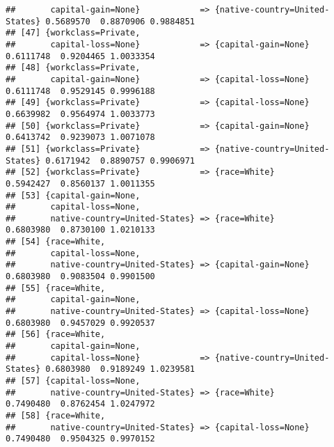 \documentclass[]{article}
\begin{document}
\begin{verbatim}
##       capital-gain=None}            => {native-country=United-States} 0.5689570  0.8870906 0.9884851
## [47] {workclass=Private,                                                                            
##       capital-loss=None}            => {capital-gain=None}            0.6111748  0.9204465 1.0033354
## [48] {workclass=Private,                                                                            
##       capital-gain=None}            => {capital-loss=None}            0.6111748  0.9529145 0.9996188
## [49] {workclass=Private}            => {capital-loss=None}            0.6639982  0.9564974 1.0033773
## [50] {workclass=Private}            => {capital-gain=None}            0.6413742  0.9239073 1.0071078
## [51] {workclass=Private}            => {native-country=United-States} 0.6171942  0.8890757 0.9906971
## [52] {workclass=Private}            => {race=White}                   0.5942427  0.8560137 1.0011355
## [53] {capital-gain=None,                                                                            
##       capital-loss=None,                                                                            
##       native-country=United-States} => {race=White}                   0.6803980  0.8730100 1.0210133
## [54] {race=White,                                                                                   
##       capital-loss=None,                                                                            
##       native-country=United-States} => {capital-gain=None}            0.6803980  0.9083504 0.9901500
## [55] {race=White,                                                                                   
##       capital-gain=None,                                                                            
##       native-country=United-States} => {capital-loss=None}            0.6803980  0.9457029 0.9920537
## [56] {race=White,                                                                                   
##       capital-gain=None,                                                                            
##       capital-loss=None}            => {native-country=United-States} 0.6803980  0.9189249 1.0239581
## [57] {capital-loss=None,                                                                            
##       native-country=United-States} => {race=White}                   0.7490480  0.8762454 1.0247972
## [58] {race=White,                                                                                   
##       native-country=United-States} => {capital-loss=None}            0.7490480  0.9504325 0.9970152

\end{verbatim}
\end{document}

